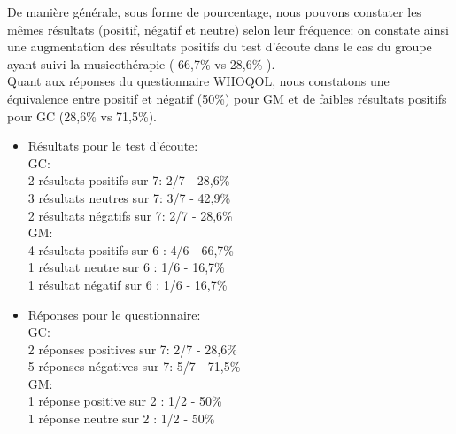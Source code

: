   
  
  De manière générale, sous forme de pourcentage, nous pouvons constater les mêmes résultats (positif, 
  négatif et neutre) 
 selon leur fréquence: on constate ainsi une augmentation des résultats positifs du test d'écoute dans le 
 cas du groupe ayant suivi la musicothérapie ( 66,7\% vs 28,6\% ). 
 	 \\ 
 Quant aux réponses du questionnaire WHOQOL, nous constatons une équivalence entre positif et 
 négatif (50\%) pour GM et de faibles résultats positifs pour GC (28,6\% vs 71,5\%).
    
   \begin{itemize}
   	 \item Résultats pour le test d'écoute:
   	 \\ 
 GC: 
  \\
2 résultats positifs sur 7:       2/7 - 28,6\%
\\
3 résultats neutres sur 7:			3/7 - 42,9\%
 \\
 2 résultats négatifs sur 7:		2/7 - 28,6\%
 \\
GM:
  \\
 4 résultats positifs sur 6    :       4/6 - 66,7\%
  \\
  1 résultat neutre sur 6 : 			1/6 - 16,7\%
 \\  
  1 résultat négatif sur 6 : 		     1/6 - 16,7\%
 \\
  		    \item Réponses pour le questionnaire:    
 \\
 GC: 
 \\
 2 réponses positives sur 7:       2/7  - 28,6\%
 \\
 5 réponses négatives sur 7: 	5/7 - 71,5\%
 \\
 GM:
  \\
 1 réponse positive sur 2    :       1/2 - 50\%
   \\
   1 réponse neutre sur 2 : 			1/2 - 50\%
  		  \end{itemize}
 
